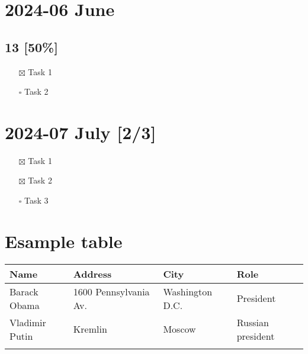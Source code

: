 \documentclass[11pt]{article}
\begin{document}
\section{2024-06 June}
\label{sec:org2b9feec}
\subsection{13 [50\%]}
\label{sec:org30b91bd}
\begin{itemize}
\item[{$\boxtimes$}] Task 1
\item[{$\square$}] Task 2
\end{itemize}
\section{2024-07 July [2/3]}
\label{sec:org6d06e8c}
\begin{itemize}
\item[{$\boxtimes$}] Task 1
\item[{$\boxtimes$}] Task 2
\item[{$\square$}] Task 3
\end{itemize}

\section{Esample table}
\label{sec:orgdaadfd3}

\begin{center}
\begin{tabular}{llll}
Name & Address & City & Role\\[0pt]
\hline
Barack Obama & 1600 Pennsylvania Av. & Washington D.C. & President\\[0pt]
Vladimir Putin & Kremlin & Moscow & Russian president\\[0pt]
\hline
 &  &  & \\[0pt]
\end{tabular}
\end{center}
\end{document}
